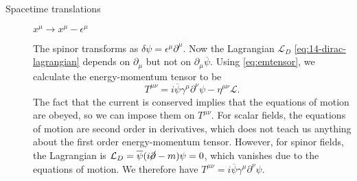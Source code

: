 \begin{description}
  \item[Spacetime translations] $x^{\mu} \to x^{\mu}-\epsilon^{\mu}$ \par
    The spinor transforms as $\delta \psi = \epsilon^{\mu} \partial^{\mu}$. Now the Lagrangian $\mathcal{L}_D$ \eqref{eq:14-dirac-lagrangian} depends on $\partial_{\mu}$ but not on $\partial_{\mu} \overline{\psi}$. Using \eqref{eq:emtensor}, we calculate the energy-momentum tensor to be
    \begin{equation}
      T^{\mu\nu} = i \overline{\psi} \gamma^{\mu} \partial^{\nu} \psi - \eta^{\mu\nu} \mathcal{L}.
    \end{equation}
    The fact that the current is conserved implies that the equations of motion are obeyed, so we can impose them on $T^{\mu\nu}$. For scalar fields, the equations of motion are second order in derivatives, which does not teach us anything about the first order energy-momentum tensor. However, for spinor fields, the Lagrangian is $\mathcal{L}_D = \overline{\psi} (i \cancel{\partial} - m) \psi =0$, which vanishes due to the equations of motion. We therefore have $T^{\mu\nu} = i \overline{\psi} \gamma^{\mu} \partial^{\nu} \psi$.
\end{description}


